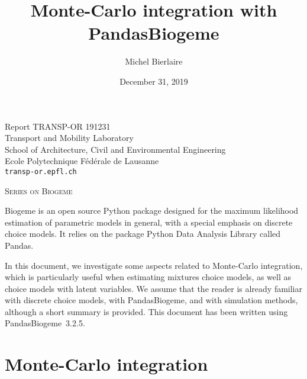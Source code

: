 \documentclass[12pt,a4paper]{article}
\title{Monte-Carlo integration with PandasBiogeme}
\author{Michel Bierlaire}
\date{December 31, 2019}
\newcommand{\PBIOGEME}{PandasBiogeme}
\begin{document}
\begin{titlepage}
\pagestyle{empty}

\maketitle
\vspace{2cm}

\begin{center}
\small Report TRANSP-OR 191231 \\ Transport and Mobility Laboratory \\ School of Architecture, Civil and Environmental Engineering \\ Ecole Polytechnique F\'ed\'erale de Lausanne \\ \verb+transp-or.epfl.ch+
\begin{center}
\textsc{Series on Biogeme}
\end{center}
\end{center}


\clearpage
\end{titlepage}

Biogeme is an open source Python package designed for the maximum
likelihood estimation of parametric models in general, with a special
emphasis on discrete choice models. It relies on the package Python
Data Analysis Library called Pandas.

 In this document, we investigate some aspects related to Monte-Carlo
 integration, which is particularly useful when estimating mixtures
 choice models, as well as choice models with latent variables. We
 assume that the reader is already familiar with discrete choice
 models, with \PBIOGEME, and with simulation methods, although a short
 summary is provided.  This document has been written using
 \PBIOGEME\ 3.2.5.

\section{Monte-Carlo integration}
\end{document}
